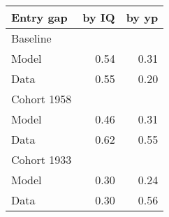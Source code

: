 \begin{tabular}{lrr}
\hline
Entry gap & by IQ  & by yp  \\ 
\hline
Baseline &   &   \\ 
Model & 0.54  & 0.31  \\ 
Data & 0.55  & 0.20  \\ 
Cohort 1958 &   &   \\ 
Model & 0.46  & 0.31  \\ 
Data & 0.62  & 0.55  \\ 
Cohort 1933 &   &   \\ 
Model & 0.30  & 0.24  \\ 
Data & 0.30  & 0.56  \\ 
\hline
\end{tabular}%
